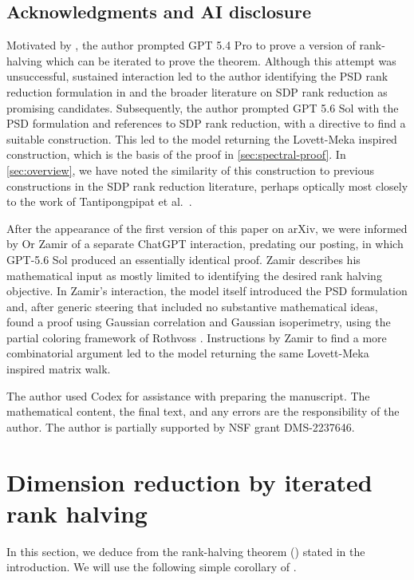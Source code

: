\documentclass[11pt,reqno,letterpaper]{amsart}
\begin{document}
\subsection*{Acknowledgments and AI disclosure}
Motivated by \cite[Theorem~2.5]{AK}, the author prompted GPT 5.4 Pro to prove a version of rank-halving which can be iterated to prove the theorem. Although this attempt was unsuccessful, sustained interaction led to the author identifying the PSD rank reduction formulation in \cite{SYZ} and the broader literature on SDP rank reduction as promising candidates. Subsequently, the author prompted GPT 5.6 Sol with the PSD formulation and references to SDP rank reduction, with a directive to find a suitable construction. This led to the model returning the Lovett-Meka inspired construction, which is the basis of the proof in \cref{sec:spectral-proof}. In \cref{sec:overview}, we have noted the similarity of this construction to previous constructions in the SDP rank reduction literature, perhaps optically most closely to the work of Tantipongpipat et al.~\cite{TSSMV19}.  

After the appearance of the first version of this paper on arXiv, we were informed by Or Zamir of a separate ChatGPT interaction, predating our posting, in which GPT-5.6 Sol produced an essentially identical proof. Zamir describes his mathematical input as mostly limited to identifying the desired rank halving objective. In Zamir's interaction, the model itself introduced the PSD formulation and, after generic steering that included no substantive mathematical ideas, found a proof using Gaussian correlation and Gaussian isoperimetry, using the partial coloring framework of Rothvoss \cite{rothvoss2017constructive}. Instructions by Zamir to find a more combinatorial argument led to the model returning the same Lovett-Meka inspired matrix walk. 
 
The author used Codex for assistance with preparing the manuscript. The mathematical content, the final text, and any  errors are the responsibility of the author.  The author is partially supported by NSF grant DMS-2237646.

\section{Dimension reduction by iterated rank halving}
\label{sec:reduction}

In this section, we deduce  from the rank-halving
theorem () stated in the introduction. We will use the following simple corollary of . 
\end{document}
